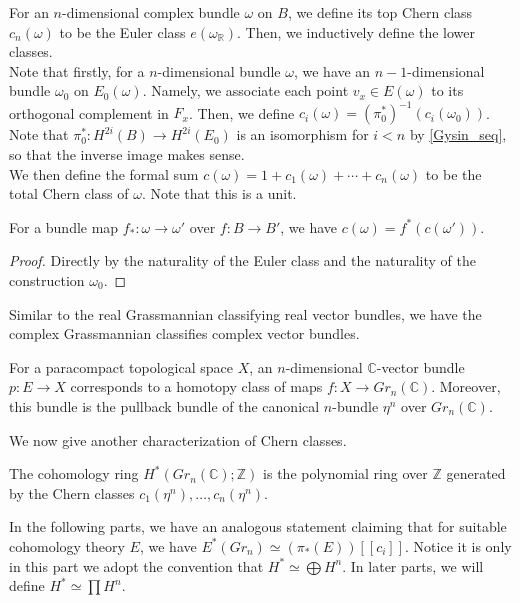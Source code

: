 	\begin{const}\label{Chern_const}
		For an $n$-dimensional complex bundle $\omega$ on $B$, we define its top Chern class $c_n(\omega)$ to be the Euler class $e(\omega_\mathbb{R})$. Then, we inductively define the lower classes. \\
		Note that firstly, for a $n$-dimensional bundle $\omega$, we have an $n-1$-dimensional bundle $\omega_0$ on $E_0(\omega)$. Namely, we associate each point $v_x\in E(\omega)$ to its orthogonal complement in $F_x$. Then, we define $c_i(\omega)=(\pi_0^*)^{-1}(c_i(\omega_0))$. Note that $\pi_0^*:H^{2i}(B)\to H^{2i}(E_0)$ is an isomorphism for $i<n$ by \cref{Gysin_seq}, so that the inverse image makes sense. \\
		We then define the formal sum $c(\omega)=1+c_1(\omega)+\cdots+c_n(\omega)$ to be the total Chern class of $\omega$. Note that this is a unit. 
	\end{const}

	\begin{lemma}\label{Chern_nat}
		For a bundle map $f_*:\omega\to\omega'$ over $f:B\to B'$, we have $c(\omega)=f^*(c(\omega'))$. 
	\end{lemma}
	\begin{proof}
		Directly by the naturality of the Euler class and the naturality of the construction $\omega_0$. 
	\end{proof}

	Similar to the real Grassmannian classifying real vector bundles, we have the complex Grassmannian classifies complex vector bundles. 
	\begin{thm}\label{Cplx_Grassmannian}
		For a paracompact topological space $X$, an $n$-dimensional $\mathbb{C}$-vector bundle $p:E\to X$ corresponds to a homotopy class of maps $f:X\to Gr_n(\mathbb{C})$. Moreover, this bundle is the pullback bundle of the canonical $n$-bundle $\eta^n$ over $Gr_n(\mathbb{C})$. 
	\end{thm}

	We now give another characterization of Chern classes. 
	\begin{thm}\label{Chern_gen}
		The cohomology ring $H^*(Gr_n(\mathbb{C});\mathbb{Z})$ is the polynomial ring over $\mathbb{Z}$ generated by the Chern classes $c_1(\eta^n),\dots,c_n(\eta^n)$. 
	\end{thm}
	\begin{remark}
		In the following parts, we have an analogous statement claiming that for suitable cohomology theory $E$, we have $E^*(Gr_n)\simeq(\pi_*(E))[[c_i]]$. Notice it is only in this part we adopt the convention that $H^*\simeq\bigoplus H^n$. In later parts, we will define $H^*\simeq\prod H^n$. 
	\end{remark}

